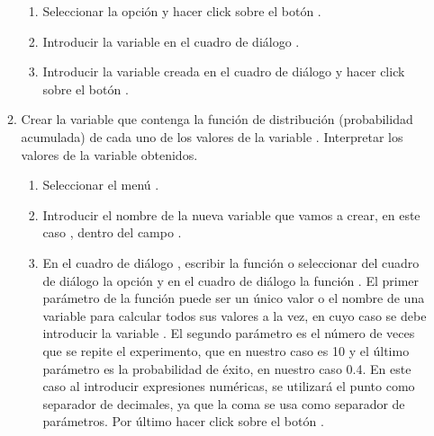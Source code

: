 \begin{enumerate}[leftmargin=*]
\begin{enumerate}
\begin{indicacion}
\begin{enumerate}
\item Seleccionar la opción  y hacer click sobre el
botón .

\item Introducir la variable  en el cuadro de diálogo
.

\item Introducir la variable creada  en el
cuadro de diálogo  y hacer click sobre el botón
.

\end{enumerate}
\end{indicacion}


\item  Crear la variable  que contenga la
función de distribución (probabilidad acumulada) de cada uno de
los valores de la variable . Interpretar los valores de
la variable obtenidos.

\begin{indicacion}
\begin{enumerate}
\item Seleccionar el menú .

\item Introducir el nombre de la nueva variable que vamos a crear,
en este caso , dentro del campo
.


\item En el cuadro de diálogo ,
escribir la función  o seleccionar del cuadro 
de diálogo  la opción  y en el 
cuadro de diálogo  la 
función . El primer parámetro de la función 
 puede ser
un único valor o el nombre de una variable para calcular todos sus
valores a la vez, en cuyo caso se debe introducir la variable .
El segundo parámetro es el número de veces que se repite el
experimento, que en nuestro caso es 10 y el último parámetro es la
probabilidad de éxito, en nuestro caso 0.4. En este caso al
introducir expresiones numéricas, se utilizará el punto como
separador de decimales, ya que la coma se usa como separador de
parámetros. Por último hacer click sobre el botón
.


\end{enumerate}
\end{indicacion}


\end{enumerate}
\end{enumerate}
